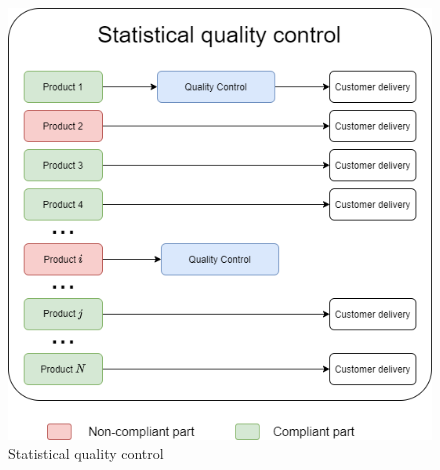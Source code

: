 \begin{figure}
\centering
\includegraphics[scale=0.50]{images/chapter_4/statistical_quality_control.png}
\caption{Statistical quality control}
\label{fig:statistical_quality_control}
\end{figure}

